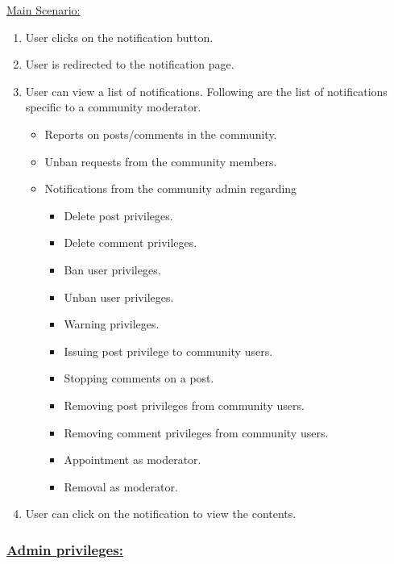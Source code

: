 \documentclass[conference,compsoc]{IEEEtran}
\begin{document}
\underline{Main Scenario:}\\
\begin{enumerate}
    \item User clicks on the notification button.
    \item User is redirected to the notification page.
    \item User can view a list of notifications. Following are the list of notifications specific to a community moderator.
          \begin{itemize}
              \item Reports on posts/comments in the community.
              \item Unban requests from the community members.
              \item Notifications from the community admin regarding
                    \begin{itemize}
                        \item Delete post privileges.
                        \item Delete comment privileges.
                        \item Ban user privileges.
                        \item Unban user privileges.
                        \item Warning privileges.
                        \item Issuing post privilege to community users.
                        \item Stopping comments on a post.
                        \item Removing post privileges from community users.
                        \item Removing comment privileges from community users.
                        \item Appointment as moderator.
                        \item Removal as moderator.
                    \end{itemize}
          \end{itemize}
    \item User can click on the notification to view the contents.
\end{enumerate}

\subsubsection{\underline{Admin privileges:}}
\end{document}
